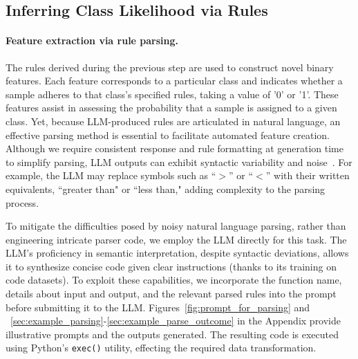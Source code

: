 \subsection{Inferring Class Likelihood via Rules}
\label{Sec:training}

\paragraph{Feature extraction via rule parsing.} The rules derived during the previous step are used to construct novel binary features. Each feature corresponds to a particular class and indicates whether a sample adheres to that class's specified rules, taking a value of '0' or '1'. These features assist in assessing the probability that a sample is assigned to a given class. Yet, because LLM-produced rules are articulated in natural language, an effective parsing method is essential to facilitate automated feature creation. Although we require consistent response and rule formatting at generation time to simplify parsing, LLM outputs can exhibit syntactic variability and noise~\cite{kovavc2023large}. For example, the LLM may replace symbols such as ``$>$” or ``$<$” with their written equivalents, ``greater than" or ``less than," adding complexity to the parsing process.

To mitigate the difficulties posed by noisy natural language parsing, rather than engineering intricate parser code, we employ the LLM directly for this task. The LLM’s proficiency in semantic interpretation, despite syntactic deviations, allows it to synthesize concise code given clear instructions (thanks to its training on code datasets). To exploit these capabilities, we incorporate the function name, details about input and output, and the relevant parsed rules into the prompt before submitting it to the LLM. Figures~\ref{fig:prompt_for_parsing} and ~\ref{sec:example_parsing}-\ref{sec:example_parse_outcome} in the Appendix provide illustrative prompts and the outputs generated. The resulting code is executed using Python’s \texttt{exec()} utility, effecting the required data transformation.

\vspace*{-0.12in}
